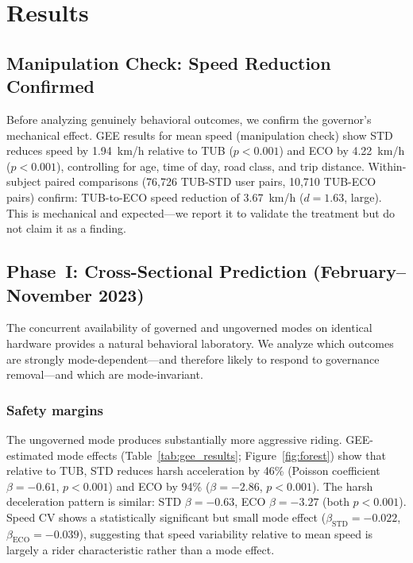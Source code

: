 \section{Results}
\label{sec:results}

\subsection{Manipulation Check: Speed Reduction Confirmed}
\label{sec:res_manipulation}

Before analyzing genuinely behavioral outcomes, we confirm the governor's mechanical effect. GEE results for mean speed (manipulation check) show STD reduces speed by 1.94~km/h relative to TUB ($p < 0.001$) and ECO by 4.22~km/h ($p < 0.001$), controlling for age, time of day, road class, and trip distance. Within-subject paired comparisons (76,726 TUB-STD user pairs, 10,710 TUB-ECO pairs) confirm: TUB-to-ECO speed reduction of 3.67~km/h ($d = 1.63$, large). This is mechanical and expected---we report it to validate the treatment but do not claim it as a finding.

\subsection{Phase~I: Cross-Sectional Prediction (February--November 2023)}
\label{sec:res_prediction}

The concurrent availability of governed and ungoverned modes on identical hardware provides a natural behavioral laboratory. We analyze which outcomes are strongly mode-dependent---and therefore likely to respond to governance removal---and which are mode-invariant.

\subsubsection{Safety margins}

The ungoverned mode produces substantially more aggressive riding. GEE-estimated mode effects (Table~\ref{tab:gee_results}; Figure~\ref{fig:forest}) show that relative to TUB, STD reduces harsh acceleration by 46\% (Poisson coefficient $\beta = -0.61$, $p < 0.001$) and ECO by 94\% ($\beta = -2.86$, $p < 0.001$). The harsh deceleration pattern is similar: STD $\beta = -0.63$, ECO $\beta = -3.27$ (both $p < 0.001$). Speed CV shows a statistically significant but small mode effect ($\beta_{\text{STD}} = -0.022$, $\beta_{\text{ECO}} = -0.039$), suggesting that speed variability relative to mean speed is largely a rider characteristic rather than a mode effect.

